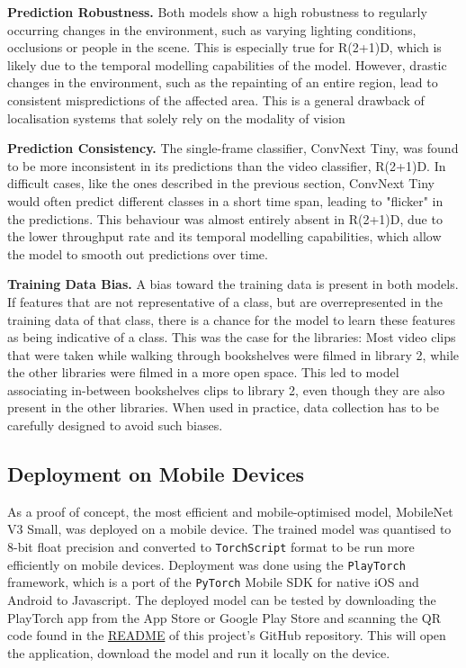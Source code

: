 \documentclass[a4paper]{article}
\begin{document}
\textbf{Prediction Robustness.} Both models show a high robustness to regularly
occurring changes in the environment, such as varying lighting conditions,
occlusions or people in the scene. This is especially true for R(2+1)D, which is
likely due to the temporal modelling capabilities of the model. However, drastic
changes in the environment, such as the repainting of an entire region, lead to
consistent mispredictions of the affected area. This is a general drawback of
localisation systems that solely rely on the modality of vision 

\textbf{Prediction Consistency.} The single-frame classifier, ConvNext Tiny, was
found to be more inconsistent in its predictions than the video classifier,
R(2+1)D. In difficult cases, like the ones described in the previous section,
ConvNext Tiny would often predict different classes in a short time span,
leading to "flicker" in the predictions. This behaviour was almost entirely
absent in R(2+1)D, due to the lower throughput rate and its temporal modelling
capabilities, which allow the model to smooth out predictions over time.

\textbf{Training Data Bias.} A bias toward the training data is present in both
models. If features that are not representative of a class, but are
overrepresented in the training data of that class, there is a chance for the
model to learn these features as being indicative of a class. This was the case
for the libraries: Most video clips that were taken while walking through
bookshelves were filmed in library 2, while the other libraries were filmed in a
more open space. This led to model associating in-between bookshelves clips to
library 2, even though they are also present in the other libraries. When used
in practice, data collection has to be carefully designed to avoid such biases.


\subsection{Deployment on Mobile Devices}
\label{sub:deploment}

As a proof of concept, the most efficient and mobile-optimised model, MobileNet
V3 Small, was deployed on a mobile device. The trained model was quantised to
8-bit float precision and converted to \texttt{TorchScript} format to be run
more efficiently on mobile devices. Deployment was done using the
\texttt{PlayTorch} framework, which is a port of the \texttt{PyTorch} Mobile SDK
for native iOS and Android to Javascript. The deployed model can be tested by
downloading the PlayTorch app from the App Store or Google Play Store and
scanning the QR code found in the \href{https://github.com/mikasenghaas}{README}
of this project's GitHub repository. This will open the application, download
the model and run it locally on the device.
\end{document}
